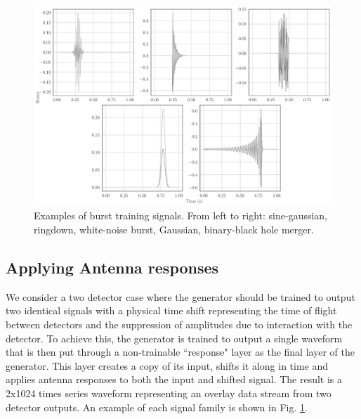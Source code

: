 \documentclass[12pt]{iopart}
\begin{document}
\begin{figure}
    \centering
    \includegraphics[width=\textwidth]{figures/train.pdf}
    \caption{Examples of burst training signals. From left to right: sine-gaussian, ringdown, white-noise burst, Gaussian, binary-black hole merger.}
    \label{fig:train}
\end{figure}

\subsection{Applying Antenna responses}
We consider a two detector case where the generator should be trained to output two identical signals with a physical time shift representing the time of flight between detectors and the suppression of amplitudes due to interaction with the detector. To achieve this, the generator is trained to output a single waveform that is then put through a non-trainable ``response" layer as the final layer of the generator. This layer creates a copy of its input, shifts it along in time and applies antenna responses to both the input and shifted signal. The result is a 2x1024 times series waveform representing an overlay data stream from two detector outputs. An example of each signal family is shown in Fig. \ref{fig:train}.
\end{document}

